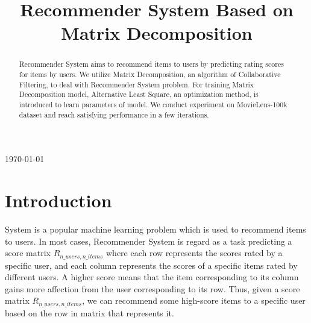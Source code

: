 \documentclass[journal, a4paper]{IEEEtran}
\begin{document}
\begin{titlepage}


{\large \today}\\[2cm] %



\vfill %

\end{titlepage}

	\title{Recommender System Based on Matrix Decomposition}
	\maketitle

\begin{abstract}
Recommender System aims to recommend items to users by predicting rating scores for items by users. 
We utilize Matrix Decomposition, an algorithm of Collaborative Filtering, to deal with Recommender System problem.
For training Matrix Decomposition model, Alternative Least Square, an optimization method, is introduced to learn parameters of model.
We conduct experiment on MovieLens-100k dataset and reach satisfying performance in a few iterations.
\end{abstract}

\section{Introduction}
 System is a popular machine learning problem which is used to recommend items to users.
In most cases, Recommender System is regard as a task predicting a score matrix $R_{n\_users,n\_items}$ where each row represents the scores rated by a specific user, and each column represents the scores of a specific items rated by different users.
A higher score means that the item corresponding to its column gains more affection from the user corresponding to its row.
Thus, given a score matrix $R_{n\_users,n\_items}$, we can recommend some high-score items to a specific user based on the row in matrix that represents it.
\end{document}
